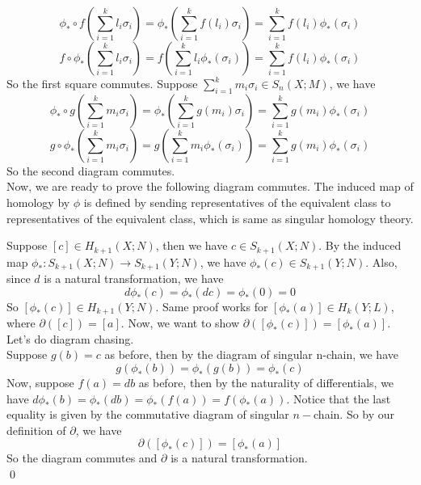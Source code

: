 \documentclass[12pt]{amsart}
\begin{document}
\[\phi_\ast\circ f(\sum_{i=1}^kl_i\sigma_i)=\phi_\ast(\sum_{i=1}^kf(l_i)\sigma_i)=\sum_{i=1}^kf(l_i)\phi_\ast(\sigma_i)\]
\[f\circ \phi_\ast(\sum_{i=1}^kl_i\sigma_i)=f(\sum_{i=1}^kl_i\phi_\ast(\sigma_i))=\sum_{i=1}^kf(l_i)\phi_\ast(\sigma_i)\]
So the first square commutes. Suppose $\sum_{i=1}^km_i\sigma_i\in S_n(X;M)$, we have 
\[\phi_\ast\circ g(\sum_{i=1}^km_i\sigma_i)=\phi_\ast(\sum_{i=1}^kg(m_i)\sigma_i)=\sum_{i=1}^kg(m_i)\phi_\ast(\sigma_i)\]
\[g\circ \phi_\ast(\sum_{i=1}^km_i\sigma_i)=g(\sum_{i=1}^km_i\phi_\ast(\sigma_i))=\sum_{i=1}^kg(m_i)\phi_\ast(\sigma_i)\]
So the second diagram commutes.\\
Now, we are ready to prove the following diagram commutes. The induced map of homology by $\phi$ is defined by sending representatives of the equivalent class to representatives of the equivalent class, which is same as singular homology theory.
\begin{center}
\end{center}
Suppose $[c]\in H_{k+1}(X;N)$, then we have $c\in S_{k+1}(X;N)$. By the induced map $\phi_\ast:S_{k+1}(X;N)\to S_{k+1}(Y;N)$, we have $\phi_\ast(c)\in S_{k+1}(Y;N)$. Also, since $d$ is a natural transformation, we have 
\[d\phi_\ast(c)=\phi_\ast(dc)=\phi_\ast(0)=0\]
So $[\phi_\ast(c)]\in H_{k+1}(Y;N)$. Same proof works for $[\phi_\ast(a)]\in H_k(Y;L)$, where $\partial([c])=[a]$. Now, we want to show $\partial([\phi_\ast(c)])=[\phi_\ast(a)]$. Let's do diagram chasing.\\
Suppose $g(b)=c$ as before, then by the diagram of singular n-chain, we have 
\[g(\phi_\ast(b))=\phi_\ast(g(b))=\phi_\ast(c)\]
Now, suppose $f(a)=db$ as before, then by the naturality of differentials, we have $d\phi_\ast(b)=\phi_\ast(db)=\phi_\ast(f(a))=f(\phi_\ast(a))$. Notice that the last equality is given by the commutative diagram of singular $n-$chain. So by our definition of $\partial$, we have 
\[\partial([\phi_\ast(c)])=[\phi_\ast(a)]\]
So the diagram commutes and $\partial$ is a natural transformation.
\\\qed\\
\end{document}
